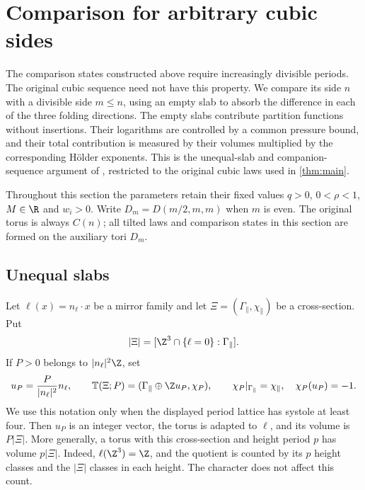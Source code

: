 \section{Comparison for arbitrary cubic sides}\label{sec:different-sides}

The comparison states constructed above require increasingly divisible
periods. The original cubic sequence need not have this property.
We compare its side $n$ with a divisible side $m\le n$, using an
empty slab to absorb the difference in each of the three folding
directions. The empty slabs contribute partition functions without
insertions. Their logarithms are controlled by a common pressure
bound, and their total contribution is measured by their volumes
multiplied by the corresponding H\"older exponents. This is the
unequal-slab and companion-sequence argument of
\cite[Sections~11.1--11.5]{ChamberQED}, restricted to the original
cubic laws used in \cref{thm:main}.

Throughout this section the parameters retain their fixed values
$q>0$, $0<\rho<1$, $M\in\R$ and $w_i>0$. Write
$D_m=D(m/2,m,m)$ when $m$ is even. The original torus is always
$C(n)$; all tilted laws and comparison states in this section are
formed on the auxiliary tori $D_m$.

\subsection{Unequal slabs}\label{sec:unequal-heights}

Let $\ell(x)=n_\ell\cdot x$ be a mirror family and let
$\Xi=(\Gamma_\parallel,\chi_\parallel)$ be a cross-section. Put
\[
 |\Xi|=[\Z^3\cap\{\ell=0\}:\Gamma_\parallel].
\]
If $P>0$ belongs to $|n_\ell|^2\Z$, set
\[
 u_P=\frac{P}{|n_\ell|^2}n_\ell,\qquad
 \mathbb T(\Xi;P)=
   (\Gamma_\parallel\oplus\Z u_P,\chi_P),
 \qquad \chi_P|_{\Gamma_\parallel}=\chi_\parallel,
 \quad\chi_P(u_P)=-1.
\]
We use this notation only when the displayed period lattice has systole
at least four. Then $u_P$ is an integer vector, the torus is adapted
to $\ell$, and its volume is $P|\Xi|$. More generally, a torus with
this cross-section and height period $p$ has volume $p|\Xi|$.
Indeed, $\ell(\Z^3)=\Z$, and the quotient is counted by its $p$
height classes and the $|\Xi|$ classes in each height. The character
does not affect this count.

